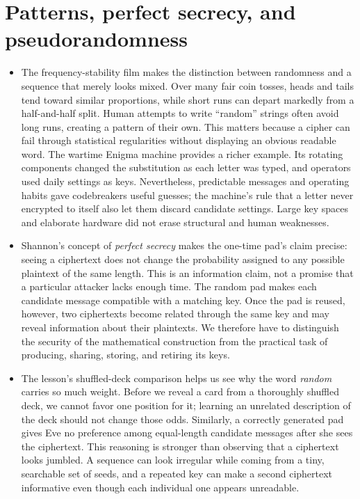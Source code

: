 \documentclass[10pt]{article}
\begin{document}
\section*{Patterns, perfect secrecy, and pseudorandomness}

\begin{itemize}[leftmargin=1.25em, itemsep=0.3em, parsep=0pt, topsep=0pt]
    \item The frequency-stability film makes the distinction between randomness and a sequence that merely looks mixed. Over many fair coin tosses, heads and tails tend toward similar proportions, while short runs can depart markedly from a half-and-half split. Human attempts to write ``random'' strings often avoid long runs, creating a pattern of their own. This matters because a cipher can fail through statistical regularities without displaying an obvious readable word. The wartime Enigma machine provides a richer example. Its rotating components changed the substitution as each letter was typed, and operators used daily settings as keys. Nevertheless, predictable messages and operating habits gave codebreakers useful guesses; the machine's rule that a letter never encrypted to itself also let them discard candidate settings. Large key spaces and elaborate hardware did not erase structural and human weaknesses.

    \item Shannon's concept of \textit{perfect secrecy} makes the one-time pad's claim precise: seeing a ciphertext does not change the probability assigned to any possible plaintext of the same length. This is an information claim, not a promise that a particular attacker lacks enough time. The random pad makes each candidate message compatible with a matching key. Once the pad is reused, however, two ciphertexts become related through the same key and may reveal information about their plaintexts. We therefore have to distinguish the security of the mathematical construction from the practical task of producing, sharing, storing, and retiring its keys.

    \item The lesson's shuffled-deck comparison helps us see why the word \textit{random} carries so much weight. Before we reveal a card from a thoroughly shuffled deck, we cannot favor one position for it; learning an unrelated description of the deck should not change those odds. Similarly, a correctly generated pad gives Eve no preference among equal-length candidate messages after she sees the ciphertext. This reasoning is stronger than observing that a ciphertext looks jumbled. A sequence can look irregular while coming from a tiny, searchable set of seeds, and a repeated key can make a second ciphertext informative even though each individual one appears unreadable.


\end{itemize}
\end{document}
